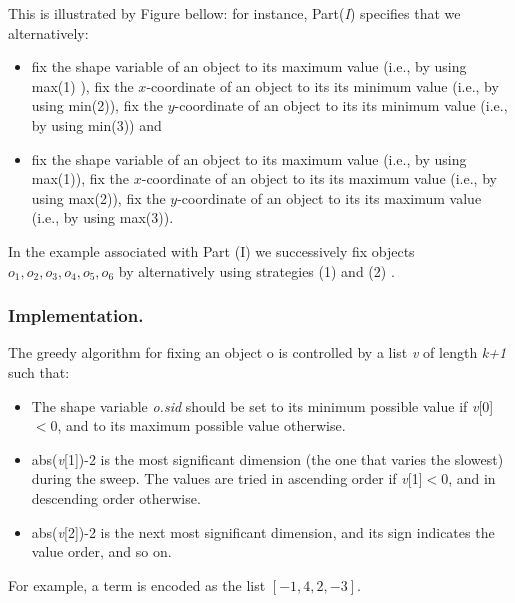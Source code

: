 This is illustrated by Figure bellow: for instance, Part(\emph{I}) specifies that we alternatively:
\begin{itemize}
	\item fix the shape variable of an object to its maximum value (i.e., by using max(1) ), fix the $x$-coordinate of an object to its its minimum value (i.e., by using min(2)), fix the $y$-coordinate of an object to its its minimum value (i.e., by using min(3)) and
	\item fix the shape variable of an object to its maximum value (i.e., by using max(1)), fix the $x$-coordinate of an object to its its maximum value (i.e., by using max(2)), fix the $y$-coordinate of an object to its its maximum value (i.e., by using max(3)).
\end{itemize}

In the example associated with Part (I) we successively fix objects $o_1, o_2, o_3, o_4, o_5, o_6$ by alternatively using strategies (1)  and (2) \mylst{object(_,max(1),x[max(2),max(3))}. 


\subsubsection{Implementation.}\label{geostdescription:implementation}\hypertarget{geostdescription:implementation}{}
The greedy algorithm for fixing an object o is controlled by a list \emph{v} of length \emph{k+1} such that:
\begin{itemize}
	\item The shape variable \emph{o.sid} should be set to its minimum possible value if \emph{v}[0]$<0$, and to its maximum possible value otherwise.
	\item abs(\emph{v}[1])-2 is the most significant dimension (the one that varies the slowest) during the sweep. The values are tried in ascending order if \emph{v}[1]$<0$, and in descending order otherwise.
	\item abs(\emph{v}[2])-2 is the next most significant dimension, and its sign indicates the value order, and so on.
\end{itemize}

For example, a term  is encoded as the list $[-1,4,2,-3]$.
	                                      
